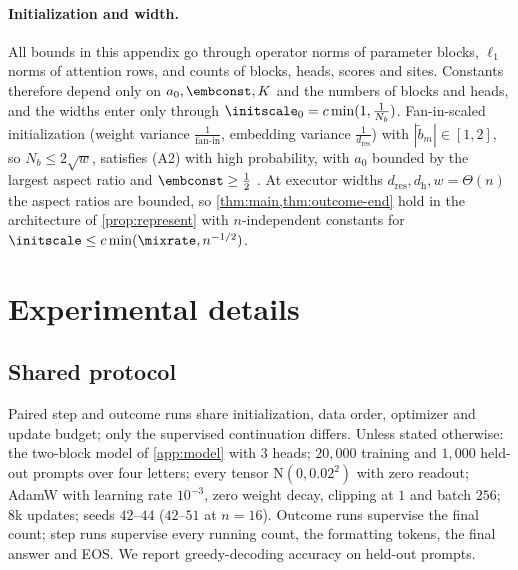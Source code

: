 \paragraph{Initialization and width.}
\label{rem:end-width}
All bounds in this appendix go through operator norms of parameter blocks, $\ell_1$ norms of attention rows, and counts of blocks,
heads, scores and sites. Constants therefore depend only on $a_0,\embconst,K$ and the numbers of blocks and heads, and the widths enter only
through $\initscale_0=c\min(1,\frac{1}{N_b})$. Fan-in-scaled initialization (weight variance $\frac{1}{\text{fan-in}}$, embedding variance $\frac{1}{d_{\mathrm{res}}}$) with
$|\tilde b_m|\in[1,2]$, so $N_b\le2\sqrt w$, satisfies (A2) with high probability, with $a_0$ bounded by the largest aspect ratio and $\embconst\ge\frac{1}{2}$
\citep[Thms.~4.4.5, 4.6.1]{vershynin2018high}. At executor widths $d_{\mathrm{res}},d_{\mathrm h},w=\Theta(n)$ the aspect ratios are bounded, so
\cref{thm:main,thm:outcome-end} hold in the architecture of \cref{prop:represent} with $n$-independent constants for
$\initscale\le c\min(\mixrate,n^{-1/2})$.








\section{Experimental details}
\label{app:experiments}
\label{app:experimental-details}

\subsection{Shared protocol}
\label{app:letter-protocol}
Paired step and outcome runs share initialization, data order, optimizer and update budget; only the supervised continuation
differs. Unless stated otherwise: the two-block model of \cref{app:model} with $3$ heads; $20{,}000$ training and $1{,}000$ held-out
prompts over four letters; every tensor $\mathrm N(0,0.02^2)$ with zero readout; AdamW with learning rate $10^{-3}$, zero weight decay,
clipping at $1$ and batch $256$; $8$k updates; seeds $42$--$44$ ($42$--$51$ at $n=16$). Outcome runs supervise the final count; step
runs supervise every running count, the formatting tokens, the final answer and EOS. We report greedy-decoding accuracy on held-out prompts.
\label{tab:protocol}

